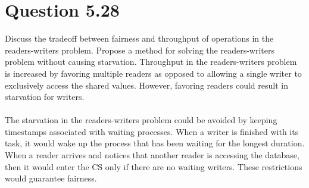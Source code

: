 \documentclass[12pt]{article}
\begin{document}
\section*{Question 5.28} {\color{blue}Discuss the tradeoff between fairness and throughput of operations in the readers-writers problem. Propose a method for solving the readers-writers problem without causing starvation.} 
Throughput in the readers-writers problem is increased by favoring multiple readers as opposed to allowing a single writer to exclusively access the shared values. However, favoring readers could result in starvation for writers. 
\\ \\
The starvation in the readers-writers problem could be avoided by keeping timestamps associated with waiting processes. When a writer is finished with its task, it would wake up the process that has been waiting for the longest duration. When a reader arrives and notices that another reader is accessing the database, then it would enter the CS only if there are no waiting writers. These restrictions would guarantee fairness.
\end{document}
